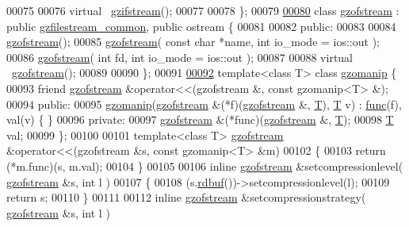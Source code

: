 \begin{DoxyCode}
00075 
00076   \textcolor{keyword}{virtual} ~\hyperlink{classgzifstream}{gzifstream}();
00077 
00078 \};
00079 
\hyperlink{classgzofstream}{00080} \textcolor{keyword}{class }\hyperlink{classgzofstream}{gzofstream} : \textcolor{keyword}{public} \hyperlink{classgzfilestream__common}{gzfilestream\_common}, \textcolor{keyword}{public} ostream \{
00081 
00082 \textcolor{keyword}{public}:
00083 
00084   \hyperlink{classgzofstream}{gzofstream}();
00085   \hyperlink{classgzofstream}{gzofstream}( \textcolor{keyword}{const} \textcolor{keywordtype}{char} *name, \textcolor{keywordtype}{int} io\_mode = ios::out );
00086   \hyperlink{classgzofstream}{gzofstream}( \textcolor{keywordtype}{int} fd, \textcolor{keywordtype}{int} io\_mode = ios::out );
00087 
00088   \textcolor{keyword}{virtual} ~\hyperlink{classgzofstream}{gzofstream}();
00089 
00090 \};
00091 
\hyperlink{classgzomanip}{00092} \textcolor{keyword}{template}<\textcolor{keyword}{class} T> \textcolor{keyword}{class }\hyperlink{classgzomanip}{gzomanip} \{
00093   \textcolor{keyword}{friend} \hyperlink{classgzofstream}{gzofstream} &operator<<(gzofstream &, const gzomanip<T> &);
00094 \textcolor{keyword}{public}:
00095   \hyperlink{classgzomanip}{gzomanip}(\hyperlink{classgzofstream}{gzofstream} &(*f)(\hyperlink{classgzofstream}{gzofstream} &, \hyperlink{group___sparse_core___module}{T}), \hyperlink{group___sparse_core___module}{T} v) : 
      \hyperlink{structfunc}{func}(f), val(v) \{ \}
00096 \textcolor{keyword}{private}:
00097   \hyperlink{classgzofstream}{gzofstream} &(*func)(\hyperlink{classgzofstream}{gzofstream} &, \hyperlink{group___sparse_core___module}{T});
00098   \hyperlink{group___sparse_core___module}{T} val;
00099 \};
00100 
00101 \textcolor{keyword}{template}<\textcolor{keyword}{class} T> \hyperlink{classgzofstream}{gzofstream} &operator<<(gzofstream &s, const gzomanip<T> &m)
00102 \{
00103   \textcolor{keywordflow}{return} (*m.func)(s, m.val);
00104 \}
00105 
00106 \textcolor{keyword}{inline} \hyperlink{classgzofstream}{gzofstream} &setcompressionlevel( \hyperlink{classgzofstream}{gzofstream} &s, \textcolor{keywordtype}{int} l )
00107 \{
00108   (s.\hyperlink{classgzofstream_a2fef74202b114357f41cfeb28f1d2acc}{rdbuf}())->setcompressionlevel(l);
00109   \textcolor{keywordflow}{return} s;
00110 \}
00111 
00112 \textcolor{keyword}{inline} \hyperlink{classgzofstream}{gzofstream} &setcompressionstrategy( \hyperlink{classgzofstream}{gzofstream} &s, \textcolor{keywordtype}{int} l )

\end{DoxyCode}
